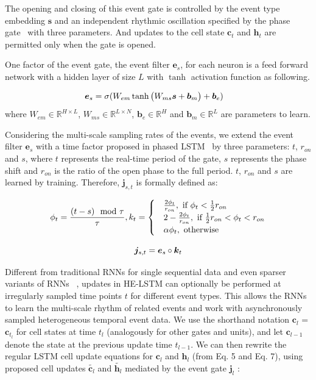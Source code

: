 \documentclass[letterpaper]{article} %
\begin{document}
The
opening and closing of this event gate is controlled by the event type embedding $\bm s$ and an independent rhythmic oscillation specified by the phase gate~\cite{neil2016phased} with three parameters.
And updates to the cell state $\bm c_t$ and $\bm h_t$ are permitted only when the gate is opened.

One factor of the event gate, the event filter $\bm e_{s}$, for each neuron is a feed forward network with a hidden layer of size $L$ with $\tanh$ activation function as following.

\begin{align}
\setlength{\abovedisplayskip}{3pt}
\bm e_s &=  \sigma(W_{em} \tanh\big (W_{ms} \bm s + \bm b_m \big) + \bm b_e)
\setlength{\belowdisplayskip}{3pt}
\end{align}
where $ W_{em} \in \mathbb{R}^{H\times L }$, $ W_{ms} \in \mathbb{R}^{L\times N}$, $\bm b_e\in \mathbb{R}^{H}$ and $\bm b_m\in \mathbb{R}^{L}$ are parameters to learn.


Considering the multi-scale sampling rates of the events, we extend  the event filter $\bm e_s$ with a time factor proposed in phased LSTM~\cite{neil2016phased} by three parameters:  $t$, $r_{on}$ and $s$, where $t$ represents
the real-time period of the gate, $s$ represents the phase shift and
$r_{on}$ is the ratio of the open phase to the full period. $t$, $r_{on}$ and $s$ are learned by training. Therefore, $\bm j_{s,t}$ is formally defined as:

\begin{align}
\setlength{\abovedisplayskip}{3pt}
\phi_t = \frac{(t-s)\mod \tau}{\tau},
k_t = \begin{cases}
& \frac{2\phi_t}{r_{on}},\text{ if } \phi_t < \frac{1}{2}r_{on} \\
& 2-\frac{2\phi_t}{r_{on}},\text{ if } \frac{1}{2}r_{on} < \phi_t < r_{on}  \\
& \alpha\phi_t,\text{ otherwise }
\end{cases}
\setlength{\belowdisplayskip}{3pt}
\end{align}



\begin{equation}
\setlength{\abovedisplayskip}{3pt}
\bm j_{s,t} = \bm e_s \circ \bm k_t
\setlength{\belowdisplayskip}{3pt}
\end{equation}


Different from traditional RNNs for single sequential data and even sparser variants of RNNs ~\cite{koutnik2014clockwork}, updates in HE-LSTM
can optionally be performed at irregularly sampled time points $t$ for different event types.
This allows the RNNs to learn the multi-scale rhythm of related events and work with asynchronously sampled
heterogeneous temporal event data.
We use the shorthand notation $\bm c_l$ = $\bm c_{t_l}$ for cell
states at time $t_l$ (analogously for other gates and units), and let $\bm c_{l-1}$ denote the state at the previous
update time $t_{l-1}$. We can then rewrite the regular LSTM cell update equations for $\bm c_l$ and $\bm h_l$ (from
Eq. 5 and Eq. 7), using proposed cell updates $\tilde{\bm c_l}$ and $\tilde{\bm h_l}$ mediated by the event gate $\bm j_l$ :
\end{document}

